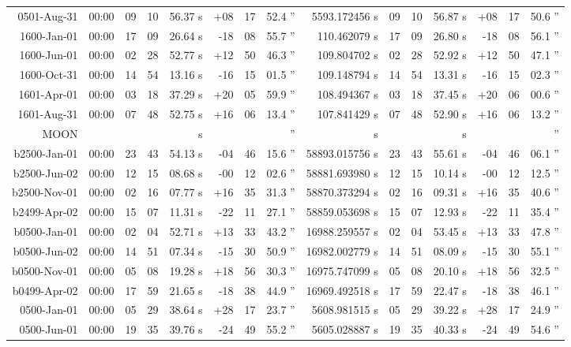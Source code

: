 \begin{longtable}{r@{\,}r|r@{h}r@{m}r<{s}|r@{°}r@{'}r<{''}|r<{s}||r@{h}r@{m}r<{s}|r@{°}r@{'}r<{''}}
 0501-Aug-31 &00:00   &  09 & 10 & 56.37 & +08 & 17 & 52.4  &  5593.172456 & 09&10&56.87 & +08&17&50.6 \\ %
 1600-Jan-01 &00:00   &  17 & 09 & 26.64 & -18 & 08 & 55.7  &   110.462079 & 17&09&26.80 & -18&08&56.1 \\ %
 1600-Jun-01 &00:00   &  02 & 28 & 52.77 & +12 & 50 & 46.3  &   109.804702 & 02&28&52.92 & +12&50&47.1 \\ %
 1600-Oct-31 &00:00   &  14 & 54 & 13.16 & -16 & 15 & 01.5  &   109.148794 & 14&54&13.31 & -16&15&02.3 \\ %
 1601-Apr-01 &00:00   &  03 & 18 & 37.29 & +20 & 05 & 59.9  &   108.494367 & 03&18&37.45 & +20&06&00.6 \\ %
 1601-Aug-31 &00:00   &  07 & 48 & 52.75 & +16 & 06 & 13.4  &   107.841429 & 07&48&52.90 & +16&06&13.2 \\ %
MOON\\ 
b2500-Jan-01 &00:00   &  23 & 43 & 54.13 & -04 & 46 & 15.6  & 58893.015756 & 23&43&55.61 & -04&46&06.1 \\ %
b2500-Jun-02 &00:00   &  12 & 15 & 08.68 & -00 & 12 & 02.6  & 58881.693980 & 12&15&10.14 & -00&12&12.5 \\ %
b2500-Nov-01 &00:00   &  02 & 16 & 07.77 & +16 & 35 & 31.3  & 58870.373294 & 02&16&09.31 & +16&35&40.6 \\ %
b2499-Apr-02 &00:00   &  15 & 07 & 11.31 & -22 & 11 & 27.1  & 58859.053698 & 15&07&12.93 & -22&11&35.4 \\ %
b0500-Jan-01 &00:00   &  02 & 04 & 52.71 & +13 & 33 & 43.2  & 16988.259557 & 02&04&53.45 & +13&33&47.8 \\ %
b0500-Jun-02 &00:00   &  14 & 51 & 07.34 & -15 & 30 & 50.9  & 16982.002779 & 14&51&08.09 & -15&30&55.1 \\ %
b0500-Nov-01 &00:00   &  05 & 08 & 19.28 & +18 & 56 & 30.3  & 16975.747099 & 05&08&20.10 & +18&56&32.5 \\ %
b0499-Apr-02 &00:00   &  17 & 59 & 21.65 & -18 & 38 & 44.9  & 16969.492518 & 17&59&22.47 & -18&38&46.1 \\ %
 0500-Jan-01 &00:00   &  05 & 29 & 38.64 & +28 & 17 & 23.7  &  5608.981515 & 05&29&39.22 & +28&17&24.9 \\ %
 0500-Jun-01 &00:00   &  19 & 35 & 39.76 & -24 & 49 & 55.2  &  5605.028887 & 19&35&40.33 & -24&49&54.6 \\ %

\end{longtable}
